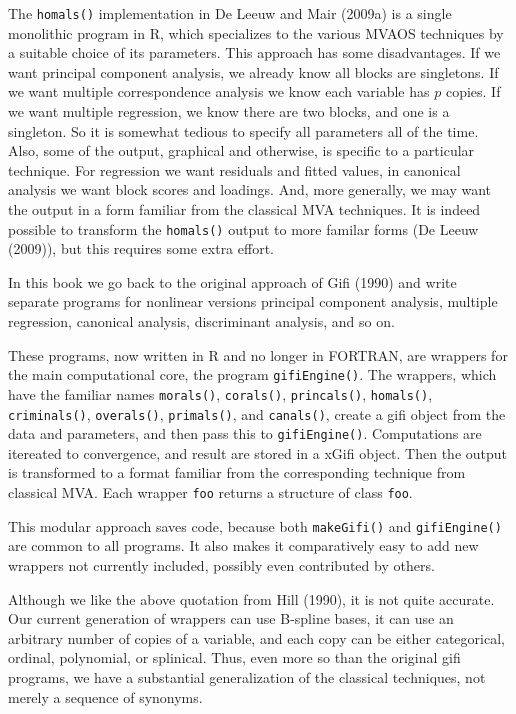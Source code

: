 \documentclass[
  12pt,
  letterpaper,
  DIV=11,
  numbers=noendperiod]{scrreprt}
\begin{document}
The \texttt{homals()} implementation in De Leeuw and Mair (2009a) is a
single monolithic program in R, which specializes to the various MVAOS
techniques by a suitable choice of its parameters. This approach has
some disadvantages. If we want principal component analysis, we already
know all blocks are singletons. If we want multiple correspondence
analysis we know each variable has \(p\) copies. If we want multiple
regression, we know there are two blocks, and one is a singleton. So it
is somewhat tedious to specify all parameters all of the time. Also,
some of the output, graphical and otherwise, is specific to a particular
technique. For regression we want residuals and fitted values, in
canonical analysis we want block scores and loadings. And, more
generally, we may want the output in a form familiar from the classical
MVA techniques. It is indeed possible to transform the \texttt{homals()}
output to more familar forms (De Leeuw (2009)), but this requires some
extra effort.

In this book we go back to the original approach of Gifi (1990) and
write separate programs for nonlinear versions principal component
analysis, multiple regression, canonical analysis, discriminant
analysis, and so on.

These programs, now written in R and no longer in FORTRAN, are wrappers
for the main computational core, the program \texttt{gifiEngine()}. The
wrappers, which have the familiar names \texttt{morals()},
\texttt{corals()}, \texttt{princals()}, \texttt{homals()},
\texttt{criminals()}, \texttt{overals()}, \texttt{primals()}, and
\texttt{canals()}, create a gifi object from the data and parameters,
and then pass this to \texttt{gifiEngine()}. Computations are itereated
to convergence, and result are stored in a xGifi object. Then the output
is transformed to a format familiar from the corresponding technique
from classical MVA. Each wrapper \texttt{foo} returns a structure of
class \texttt{foo}.

This modular approach saves code, because both \texttt{makeGifi()} and
\texttt{gifiEngine()} are common to all programs. It also makes it
comparatively easy to add new wrappers not currently included, possibly
even contributed by others.

Although we like the above quotation from Hill (1990), it is not quite
accurate. Our current generation of wrappers can use B-spline bases, it
can use an arbitrary number of copies of a variable, and each copy can
be either categorical, ordinal, polynomial, or splinical. Thus, even
more so than the original gifi programs, we have a substantial
generalization of the classical techniques, not merely a sequence of
synonyms.
\end{document}
